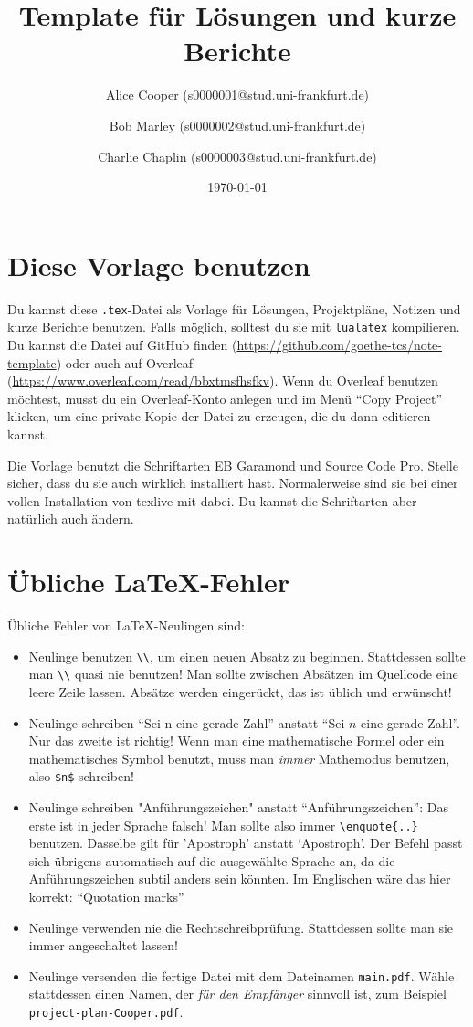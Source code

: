 \documentclass[a4paper,11pt,oneside,ngerman]{scrartcl}
\title{Template für Lösungen und kurze Berichte}
\author{%
  Alice Cooper (s0000001@stud.uni-frankfurt.de)%
  \and Bob Marley (s0000002@stud.uni-frankfurt.de)%
  \and Charlie Chaplin (s0000003@stud.uni-frankfurt.de)%
}
\date{\today}
\theoremstyle{plain}
\theoremstyle{definition}
\begin{document}
\maketitle

\section*{Diese Vorlage benutzen}

Du kannst diese \texttt{.tex}-Datei als Vorlage für Lösungen, Projektpläne, Notizen und kurze Berichte benutzen.
Falls möglich, solltest du sie mit \verb|lualatex| kompilieren.
Du kannst die Datei auf GitHub finden (\url{https://github.com/goethe-tcs/note-template}) oder auch auf Overleaf (\url{https://www.overleaf.com/read/bbxtmsfhsfkv}). Wenn du Overleaf benutzen möchtest, musst du ein Overleaf-Konto anlegen und im Menü \hyphenquote{english}{Copy Project} klicken, um eine private Kopie der Datei zu erzeugen, die du dann editieren kannst.

Die Vorlage benutzt die Schriftarten EB Garamond und Source Code Pro. Stelle sicher, dass du sie auch wirklich installiert hast. Normalerweise sind sie bei einer vollen Installation von texlive mit dabei. Du kannst die Schriftarten aber natürlich auch ändern.

\section*{Übliche \LaTeX{}-Fehler}

Übliche Fehler von \LaTeX{}-Neulingen sind:
\begin{itemize}
  \item Neulinge benutzen \verb|\\|, um einen neuen Absatz zu beginnen. Stattdessen sollte man \verb|\\| quasi nie benutzen!
  Man sollte zwischen Absätzen im Quellcode eine leere Zeile lassen. Absätze werden eingerückt, das ist üblich und erwünscht!
  \item Neulinge schreiben \enquote{Sei n eine gerade Zahl} anstatt \enquote{Sei $n$ eine gerade Zahl}. Nur das zweite ist richtig! Wenn man eine mathematische Formel oder ein mathematisches Symbol benutzt, muss man \emph{immer} Mathemodus benutzen, also \verb|$n$| schreiben!
  \item Neulinge schreiben "Anführungszeichen" anstatt \enquote{Anführungszeichen}: Das erste ist in jeder Sprache falsch! Man sollte also immer \verb|\enquote{..}| benutzen.
  Dasselbe gilt für 'Apostroph' anstatt \enquote*{Apostroph}.
  Der Befehl passt sich übrigens automatisch auf die ausgewählte Sprache an, da die Anführungszeichen subtil anders sein könnten.
  Im Englischen wäre das hier korrekt:
  \foreignlanguage{english}{\enquote{Quotation marks}}
  \item Neulinge verwenden nie die Rechtschreibprüfung. Stattdessen sollte man sie immer angeschaltet lassen!
  \item Neulinge versenden die fertige Datei mit dem Dateinamen \verb|main.pdf|. Wähle stattdessen einen Namen, der \emph{für den Empfänger} sinnvoll ist, zum Beispiel \verb|project-plan-Cooper.pdf|.
\end{itemize}
\end{document}
